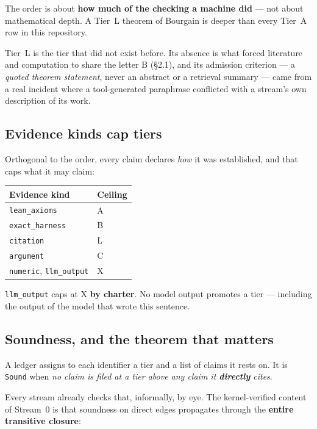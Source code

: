\documentclass[11pt,a4paper]{article}
\begin{document}
The order is about \textbf{how much of the checking a machine did} — not about mathematical
depth. A Tier~L theorem of Bourgain is deeper than every Tier~A row in this repository.

Tier~\textsf{L} is the tier that did not exist before. Its absence is what forced literature and
computation to share the letter \textsf{B} (§2.1), and its admission criterion — a \emph{quoted
theorem statement}, never an abstract or a retrieval summary — came from a real incident where a
tool-generated paraphrase conflicted with a stream's own description of its work.

\subsection{Evidence kinds cap tiers}

Orthogonal to the order, every claim declares \emph{how} it was established, and that caps what
it may claim:

\begin{center}\small
\begin{tabular}{@{}ll@{}}
\toprule
Evidence kind & Ceiling \\
\midrule
\texttt{lean_axioms}   & \textsf{A} \\
\texttt{exact_harness} & \textsf{B} \\
\texttt{citation}      & \textsf{L} \\
\texttt{argument}      & \textsf{C} \\
\texttt{numeric}, \texttt{llm_output} & \textsf{X} \\
\bottomrule
\end{tabular}
\end{center}

\texttt{llm_output} caps at \textsf{X} \textbf{by charter}. No model output promotes a tier —
including the output of the model that wrote this sentence.

\subsection{Soundness, and the theorem that matters}

A ledger assigns to each identifier a tier and a list of claims it rests on. It is \texttt{Sound}
when \emph{no claim is filed at a tier above any claim it \textbf{directly} cites}.

Every stream already checks that, informally, by eye. The kernel-verified content of Stream~0 is
that soundness on direct edges propagates through the \textbf{entire transitive closure}:
\end{document}

